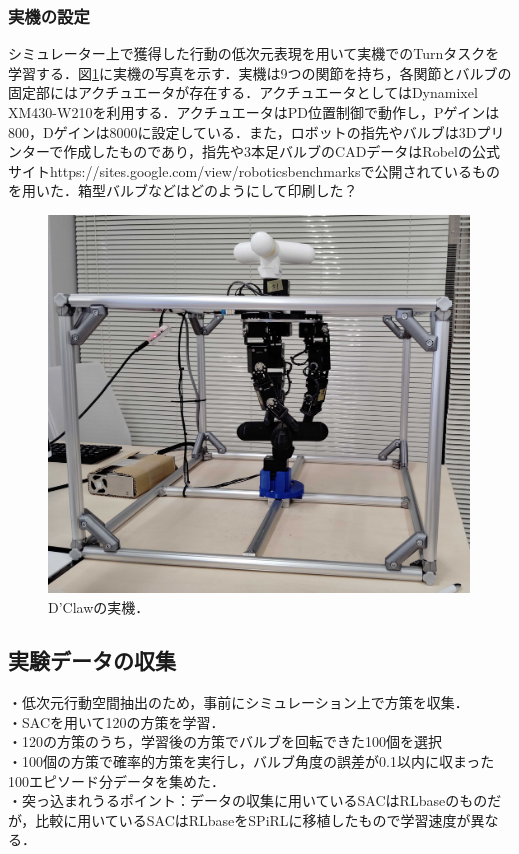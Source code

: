 \documentclass[dvipdfmx]{ampbt_nomag}
\begin{document}
\subsubsection{実機の設定}
シミュレーター上で獲得した行動の低次元表現を用いて実機でのTurnタスクを学習する．図\ref{dclaw_hardware}に実機の写真を示す．実機は9つの関節を持ち，各関節とバルブの固定部にはアクチュエータが存在する．アクチュエータとしてはDynamixel XM430-W210を利用する．アクチュエータはPD位置制御で動作し，Pゲインは800，Dゲインは8000に設定している．また，ロボットの指先やバルブは3Dプリンターで作成したものであり，指先や3本足バルブのCADデータはRobelの公式サイトhttps://sites.google.com/view/roboticsbenchmarksで公開されているものを用いた．箱型バルブなどはどのようにして印刷した？
\begin{figure}[hbtp]
  \centering
  \includegraphics[height=10cm]
       {asset/img/dclaw_hardware.pdf}
  \caption{D'Clawの実機．}
  \label{dclaw_hardware}
\end{figure}



\subsection{実験データの収集}
・低次元行動空間抽出のため，事前にシミュレーション上で方策を収集．\\
・SACを用いて120の方策を学習．\\
・120の方策のうち，学習後の方策でバルブを回転できた100個を選択\\
・100個の方策で確率的方策を実行し，バルブ角度の誤差が0.1以内に収まった100エピソード分データを集めた．\\
・突っ込まれうるポイント：データの収集に用いているSACはRLbaseのものだが，比較に用いているSACはRLbaseをSPiRLに移植したもので学習速度が異なる．
\end{document}
